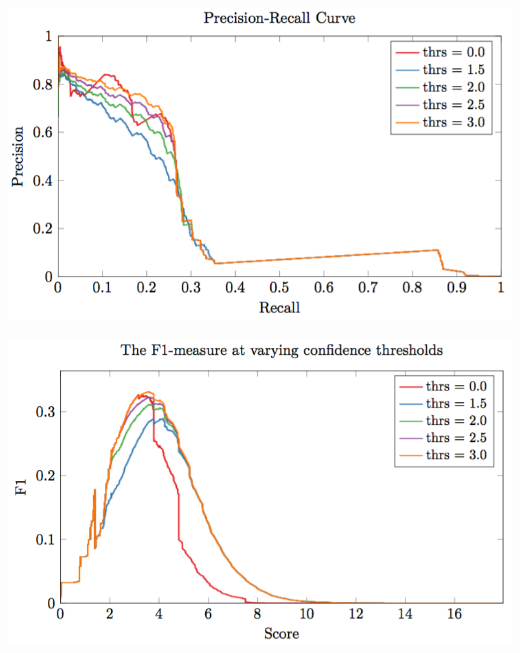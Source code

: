 \documentclass[12pt]{beamer}
\theoremstyle{break}
\begin{document}


\begin{frame}
	\centering
	\includegraphics[width=\textwidth]{images/pic5}

\end{frame}




\begin{frame}
	\centering
	\includegraphics[width=\textwidth]{images/pic6}

\end{frame}









\end{document}
